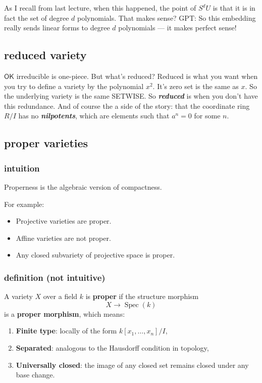 \begin{remark}\leavevmode
As I recall from last lecture, when this happened, the point of \(S^dU\) is that it is in fact the set of degree \(d\) polynomials. That makes sense? GPT: So this embedding really sends linear forms to degree \( d \) polynomials — it makes perfect sense!
\end{remark}

\subsection{reduced variety}
\(\mathsf{OK}\) irreducible is one-piece. But what's reduced? Reduced is what you want when you try to define a variety by the polynomial \(x^2\). It's zero set is the same as \(x\). So the underlying variety is the same SETWISE. So \textit{\textbf{reduced}} is when you don't have this redundance. And of course the a side of the story: that the coordinate ring  \(R/I\) has no \textit{\textbf{nilpotents}}, which are elements such that \(a^n=0\) for some \(n\).

\subsection{proper varieties}
\subsubsection*{intuition}
Properness is the algebraic version of compactness.

For example:

\begin{itemize}
\item Projective varieties are proper.

\item Affine varieties are not proper.

\item Any closed subvariety of projective space is proper.
\end{itemize}

\subsubsection*{definition (not intuitive)}
A variety \( X \) over a field \( k \) is \textbf{proper} if the structure morphism
\[
X \to \operatorname{Spec}(k)
\]
is a \textbf{proper morphism}, which means:
\begin{enumerate}
  \item \textbf{Finite type}: locally of the form \( k[x_1, \dots, x_n]/I \),
  \item \textbf{Separated}: analogous to the Hausdorff condition in topology,
  \item \textbf{Universally closed}: the image of any closed set remains closed under any base change.
\end{enumerate}



